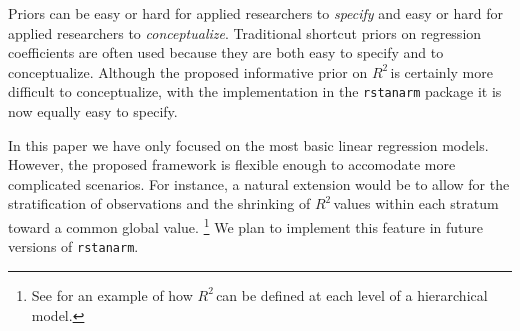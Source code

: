 \documentclass[11pt]{article}
\newcommand{\Rsq}{$R^2\,$}
\begin{document}
Priors can be easy or hard for applied researchers to \emph{specify} and easy or
hard for applied researchers to \emph{conceptualize}. Traditional shortcut
priors on regression coefficients are often used because they are both easy to
specify and to conceptualize. Although the proposed informative prior on \Rsq is
certainly more difficult to conceptualize, with the implementation in the
{\tt rstanarm} package it is now equally easy to specify.

In this paper we have only focused on the most basic linear regression models.
However, the proposed framework is flexible enough to accomodate more
complicated scenarios. For instance, a natural extension would be to allow for
the stratification of observations and the shrinking of \Rsq values within each
stratum toward a common global value.%
\footnote{See  for an example of how \Rsq can be defined at
each level of a hierarchical model.}
We plan to implement this feature in future versions of {\tt rstanarm}.


\nocite{Rcore}
\nocite{HSAUR3-package}



\end{document}
